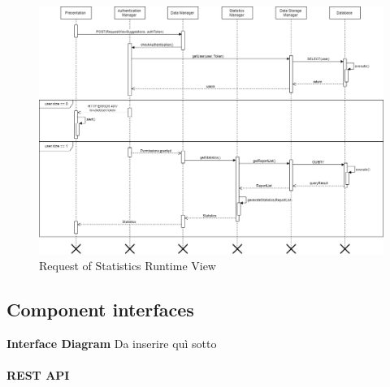 \begin{figure}[H]
          \includegraphics[scale=0.35]{Images/Seq_viewStatistics.png}
        \caption{Request of Statistics Runtime View}
\end{figure}

\subsection{Component interfaces}
\textbf{Interface Diagram} 
Da inserire quì sotto\\ \\

\textbf{REST API}\\\\




